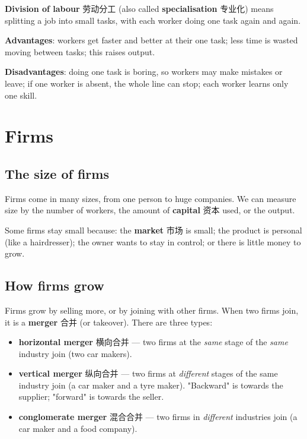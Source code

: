 \documentclass[11pt]{article}
\begin{document}
\textbf{Division of labour} 劳动分工 (also called \textbf{specialisation} 专业化) means splitting a job into small tasks, with each worker doing one task again and again.

\textbf{Advantages}: workers get faster and better at their one task; less time is wasted moving between tasks; this raises output.

\textbf{Disadvantages}: doing one task is boring, so workers may make mistakes or leave; if one worker is absent, the whole line can stop; each worker learns only one skill.

\section*{Firms}

\subsection*{The size of firms}

Firms come in many sizes, from one person to huge companies. We can measure size by the number of workers, the amount of \textbf{capital} 资本 used, or the output.

Some firms stay small because: the \textbf{market} 市场 is small; the product is personal (like a hairdresser); the owner wants to stay in control; or there is little money to grow.

\subsection*{How firms grow}

Firms grow by selling more, or by joining with other firms. When two firms join, it is a \textbf{merger} 合并 (or takeover). There are three types:

\begin{itemize}
\item \textbf{horizontal merger} 横向合并 — two firms at the \emph{same} stage of the \emph{same} industry join (two car makers).

\item \textbf{vertical merger} 纵向合并 — two firms at \emph{different} stages of the same industry join (a car maker and a tyre maker). "Backward" is towards the supplier; "forward" is towards the seller.

\item \textbf{conglomerate merger} 混合合并 — two firms in \emph{different} industries join (a car maker and a food company).

\end{itemize}
\end{document}
